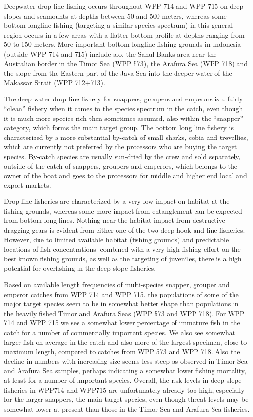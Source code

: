 Deepwater drop line fishing occurs throughout WPP 714 and WPP 715 on deep slopes and seamounts at depths between 50 and 500 meters, whereas some bottom longline fishing (targeting a similar species spectrum) in this general region occurs in a few areas with a flatter bottom profile at depths ranging from 50 to 150 meters. More important bottom longline fishing grounds in Indonesia (outside WPP 714 and 715) include a.o. the Sahul Banks area near the Australian border in the Timor Sea (WPP 573), the Arafura Sea (WPP 718) and the slope from the Eastern part of the Java Sea into the deeper water of the Makassar Strait (WPP 712+713).

The deep water drop line fishery for snappers, groupers and emperors is a fairly ``clean'' fishery when it comes to the species spectrum in the catch, even though it is much more species-rich then sometimes assumed, also within the ``snapper'' category, which forms the main target group. The bottom long line fishery is characterized by a more substantial by-catch of small sharks, cobia and trevallies, which are currently not preferred by the processors who are buying the target species. By-catch species are usually sun-dried by the crew and sold separately, outside of the catch of snappers, groupers and emperors, which belongs to the owner of the boat and goes to the processors for middle and higher end local and export markets.

Drop line fisheries are characterized by a very low impact on habitat at the fishing grounds, whereas some more impact from entanglement can be expected from bottom long lines. Nothing near the habitat impact from destructive dragging gears is evident from either one of the two deep hook and line fisheries. However, due to limited available habitat (fishing grounds) and predictable locations of fish concentrations, combined with a very high fishing effort on the best known fishing grounds, as well as the targeting of juveniles, there is a high potential for overfishing in the deep slope fisheries.

Based on available length frequencies of multi-species snapper, grouper and emperor catches from WPP 714 and WPP 715, the populations of some of the major target species seem to be in somewhat better shape than populations in the heavily fished Timor and Arafura Seas (WPP 573 and WPP 718). For WPP 714 and WPP 715 we see a somewhat lower percentage of immature fish in the catch for a number of commercially important species. We also see somewhat larger fish on average in the catch and also more of the largest specimen, close to maximum length, compared to catches from WPP 573 and WPP 718. Also the decline in numbers with increasing size seems less steep as observed in Timor Sea and Arafura Sea samples, perhaps indicating a somewhat lower fishing mortality, at least for a number of important species. Overall, the risk levels in deep slope fisheries in WPP714 and WPP715 are unfortunately already too high, especially for the larger snappers, the main target species, even though threat levels may be somewhat lower at present than those in the Timor Sea and Arafura Sea fisheries.

